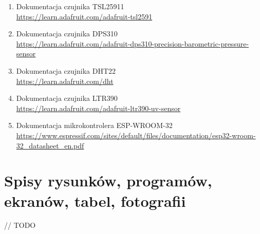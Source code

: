 \documentclass[12pt,a4paper]{article}
\begin{document}
\begin{enumerate}
    \item Dokumentacja czujnika TSL25911\\
    \url{https://learn.adafruit.com/adafruit-tsl2591}
    \item Dokumentacja czujnika DPS310\\
    \url{https://learn.adafruit.com/adafruit-dps310-precision-barometric-pressure-sensor}
    \item Dokumentacja czujnika DHT22\\
    \url{https://learn.adafruit.com/dht}
    \item Dokumentacja czujnika LTR390\\
    \url{https://learn.adafruit.com/adafruit-ltr390-uv-sensor}
    \item Dokumentacja mikrokontrolera ESP-WROOM-32\\
    \url{https://www.espressif.com/sites/default/files/documentation/esp32-wroom-32_datasheet_en.pdf}
\end{enumerate}

\section{Spisy rysunków, programów, ekranów, tabel, fotografii}
// TODO
\end{document}
